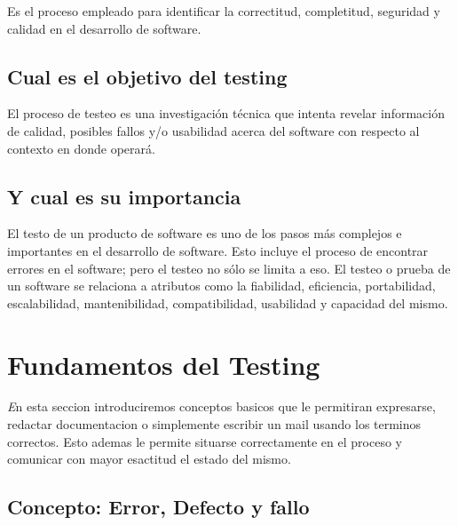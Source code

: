 \documentclass[12pt,a4paper,twoside]{article}
\begin{document}
\hspace*{1cm}Es el proceso empleado para identificar la correctitud, completitud, seguridad y calidad en el desarrollo de software.

\subsection{Cual es el objetivo del testing}

\hspace*{1cm}El proceso de testeo es una investigación técnica que intenta revelar información de calidad, posibles fallos y/o usabilidad acerca del software con respecto al contexto en donde operará.

\subsection{Y cual es su importancia}

\hspace*{1cm}El testo de un producto de software es uno de los pasos más complejos e importantes en el desarrollo de software. Esto incluye el proceso de encontrar errores en el software; pero el testeo no sólo se limita a eso. El testeo o prueba de un software se relaciona a atributos como la fiabilidad, eficiencia, portabilidad, escalabilidad, mantenibilidad, compatibilidad, usabilidad y capacidad del mismo.

\newpage
 
\section{Fundamentos del Testing}

\lettrine{\textit{E}}{}n esta seccion introduciremos conceptos basicos que le permitiran expresarse, redactar documentacion o simplemente escribir un mail usando los terminos correctos.
Esto ademas le permite situarse correctamente en el proceso y comunicar con mayor esactitud el estado del mismo.

\subsection{Concepto: Error, Defecto y fallo}
\end{document}
